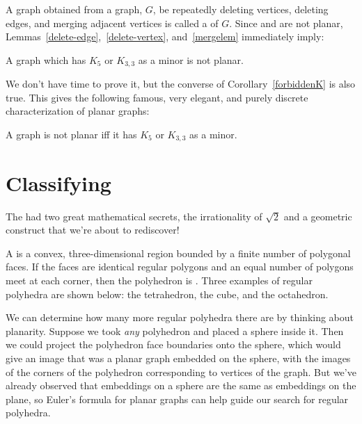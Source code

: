 A graph obtained from a graph, $G$, be repeatedly deleting vertices,
deleting edges, and merging adjacent vertices is called a  of
$G$.  Since  and  are not planar,
Lemmas~\ref{delete-edge},~\ref{delete-vertex}, and~\ref{mergelem}
immediately imply:

\begin{corollary}\label{forbiddenK}
  A graph which has $K_5$ or $K_{3,3}$ as a minor is not planar.
\end{corollary}

We don't have time to prove it, but the converse of
Corollary~\ref{forbiddenK} is also true.  This gives the following famous,
very elegant, and purely discrete characterization of planar graphs:

\begin{theorem}
  A graph is not planar iff it has $K_5$ or $K_{3,3}$ as a minor.
\end{theorem}

\section{Classifying }

The  had two great mathematical secrets, the
irrationality of $\sqrt{2}$ and a geometric construct that we're about to
rediscover!

A  is a convex, three-dimensional region bounded by a
finite number of polygonal faces.  If the faces are identical regular
polygons and an equal number of polygons meet at each corner, then the
polyhedron is .  Three examples of regular polyhedra are
shown below: the tetrahedron, the cube, and the octahedron.

We can determine how many more regular polyhedra there are by thinking
about planarity.  Suppose we took \emph{any} polyhedron and placed a
sphere inside it.  Then we could project the polyhedron face boundaries
onto the sphere, which would give an image that was a planar graph
embedded on the sphere, with the images of the corners of the polyhedron
corresponding to vertices of the graph.  But we've already observed that
embeddings on a sphere are the same as embeddings on the plane, so Euler's
formula for planar graphs can help guide our search for regular polyhedra.


